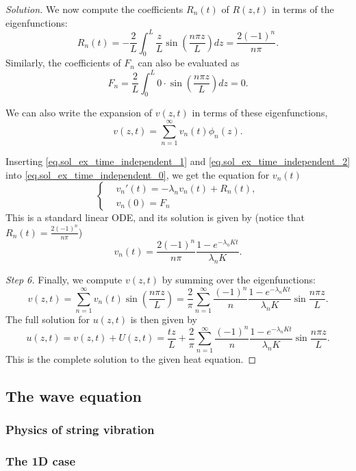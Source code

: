 \begin{proof}[Solution]
We now compute the coefficients $R_n(t)$ of $R(z, t)$ in terms of the eigenfunctions:
\[
    R_n(t) = -\frac{2}{L} \int_0^L \frac{z}{L} \sin\left( \frac{n \pi z}{L} \right) dz = \frac{2 (-1)^n}{n \pi}.
\]
Similarly, the coefficients of $F_n$ can also be evaluated as 
\[
    F_n = \frac{2}{L} \int_0^L 0\cdot \sin\left( \frac{n \pi z}{L} \right) dz = 0.
\]

We can also write the expansion of $v(z, t)$ in terms of these eigenfunctions,
\begin{equation}\label{eq.sol_ex_time_independent_2}
    v(z, t) = \sum_{n=1}^\infty v_n(t) \phi_n(z).
\end{equation}

Inserting \eqref{eq.sol_ex_time_independent_1} and \eqref{eq.sol_ex_time_independent_2} into \eqref{eq.sol_ex_time_independent_0}, we get the equation for $v_n(t)$
\[
    \left\{
    \begin{aligned}
        &v_n'(t) = -\lambda_n v_n(t) + R_n(t),
        \\
        &v_n(0) = F_n
    \end{aligned}\right.
\]
This is a standard linear ODE, and its solution is given by (notice that $R_n(t) = \frac{2 (-1)^n}{n \pi}$)
\[
    v_n(t) = \frac{2 (-1)^n}{n \pi} \frac{1-e^{-\lambda_n K t}}{\lambda_n K}.
\]

\textit{Step 6.} Finally, we compute $v(z, t)$ by summing over the eigenfunctions:
\[
    v(z, t) = \sum_{n=1}^\infty v_n(t) \sin\left( \frac{n \pi z}{L} \right) = \frac{2}{\pi} \sum_{n=1}^{\infty} \frac{(-1)^n}{n} \frac{1-e^{-\lambda_n K t}}{\lambda_n K} \sin \frac{n \pi z}{L}.
\]
The full solution for $u(z, t)$ is then given by
\[
    u(z, t) = v(z, t) + U(z, t) = \frac{t z}{L}+\frac{2}{\pi} \sum_{n=1}^{\infty} \frac{(-1)^n}{n} \frac{1-e^{-\lambda_n K t}}{\lambda_n K} \sin \frac{n \pi z}{L}.
\]
This is the complete solution to the given heat equation.
\end{proof}

\subsection{The wave equation}

\subsubsection{Physics of string vibration}

\subsubsection{The 1D case}

